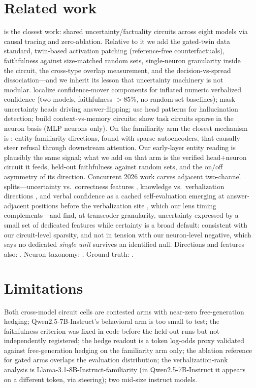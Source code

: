 \documentclass{article}
\newcommand{\lm}{Llama-3.1-8B-Instruct}
\newcommand{\qw}{Qwen2.5-7B-Instruct}
\begin{document}
\section{Related work}
\citet{teplica2025sciurus} is the closest work: shared uncertainty/factuality circuits across eight models
via causal tracing and zero-ablation. Relative to it we add the gated-twin data standard, twin-based
activation patching (reference-free counterfactuals), faithfulness against size-matched random sets,
single-neuron granularity inside the circuit, the cross-type overlap measurement, and the
decision-vs-spread dissociation---and we inherit its lesson that uncertainty machinery is not modular.
\citet{zhao2026wired} localize confidence-mover components for inflated numeric verbalized confidence (two
models, faithfulness $>85$\%, no random-set baselines); \citet{roy2025unwanted} mask uncertainty heads
driving answer-flipping; \citet{vazhentsev2026heads} use head patterns for hallucination detection;
\citet{basu2025extractiveqa} build context-vs-memory circuits; \citet{arora2026sparse} show task circuits
sparse in the neuron basis (MLP neurons only). On the familiarity arm the closest mechanism is
\citet{ferrando2025iknow}: entity-familiarity directions, found with sparse autoencoders, that causally
steer refusal through downstream attention. Our early-layer entity reading is plausibly the same signal;
what we add on that arm is the verified head$+$neuron circuit it feeds, held-out faithfulness against
random sets, and the on/off asymmetry of its direction. Concurrent 2026 work carves adjacent two-channel
splits---uncertainty vs.\ correctness features \citep{patel2026dissociation}, knowledge vs.\ verbalization
directions \citep{xiros2026knowledge}, and verbal confidence as a cached self-evaluation emerging at
answer-adjacent positions before the verbalization site \citep{kumaran2026verbal}, which our lens timing
complements---and \citet{mazzaccara2026facets} find, at transcoder granularity, uncertainty expressed by a
small set of dedicated features while certainty is a broad default: consistent with our circuit-level
sparsity, and not in tension with our neuron-level negative, which says no dedicated \emph{single unit}
survives an identified null. Directions and features also:
\citet{anthropic2025biology,ji2025hedging}. Neuron taxonomy:
\citet{stolfo2024confidence,gurnee2024universal,du2025posttraining}. Ground truth:
\citet{kadavath2022know,gekhman2024slick}.

\section{Limitations}
Both cross-model circuit cells are contested arms with near-zero free-generation hedging; \qw{}'s
behavioral arm is too small to test; the faithfulness criterion was fixed in code before the held-out runs
but not independently registered; the hedge readout is a token log-odds proxy validated against
free-generation hedging on the familiarity arm only; the ablation reference for gated arms overlaps the
evaluation distribution; the verbalization-rank analysis is \lm{}-familiarity (in \qw{} it appears on a
different token, via steering); two mid-size instruct models.
\end{document}
